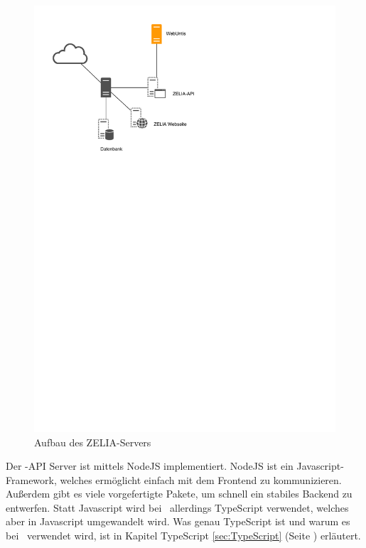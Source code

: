 \begin{figure}[H]
    \centering
    \includegraphics[width=120mm]{./media/Intro/server_arch.svg.pdf}
    \caption{Aufbau des ZELIA-Servers}
    \label{fig:server_arch}
\end{figure}

Der \ZELIA-API Server ist mittels NodeJS implementiert. NodeJS ist ein Javascript-Framework, welches ermöglicht einfach mit dem Frontend zu kommunizieren. Außerdem gibt es viele vorgefertigte Pakete, um schnell ein stabiles Backend zu entwerfen. Statt Javascript wird bei \ZELIA\ allerdings TypeScript verwendet, welches aber in Javascript umgewandelt wird. Was genau TypeScript ist und warum es bei \ZELIA\ verwendet wird, ist in Kapitel TypeScript \ref{sec:TypeScript} (Seite \pageref{sec:TypeScript}) erläutert.


